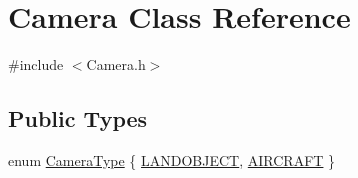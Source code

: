 \hypertarget{class_camera}{\section{Camera Class Reference}
\label{class_camera}
}


{\ttfamily \#include $<$Camera.\-h$>$}

\subsection*{Public Types}
\begin{DoxyCompactItemize}
\item 
enum \hyperlink{class_camera_ae94737abf74ae95b4c77a0dc931d5b1b}{Camera\-Type} \{ \hyperlink{class_camera_ae94737abf74ae95b4c77a0dc931d5b1bad7f88c138814859728837a4a4224f313}{L\-A\-N\-D\-O\-B\-J\-E\-C\-T}, 
\hyperlink{class_camera_ae94737abf74ae95b4c77a0dc931d5b1bad2e38edb6cf21fe97b98867f8909bc59}{A\-I\-R\-C\-R\-A\-F\-T}
 \}
\end{DoxyCompactItemize}
